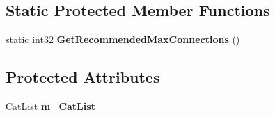 \subsection*{Static Protected Member Functions}
\begin{DoxyCompactItemize}
\item 
static int32 {\bfseries GetRecommendedMaxConnections} ()\label{classCPreferences_a094265c0e6e3a0c77870ae82401feda7}

\end{DoxyCompactItemize}
\subsection*{Protected Attributes}
\begin{DoxyCompactItemize}
\item 
CatList {\bfseries m\_\-CatList}\label{classCPreferences_abcc1bf572707271ea8112064a7240dd0}

\end{DoxyCompactItemize}
